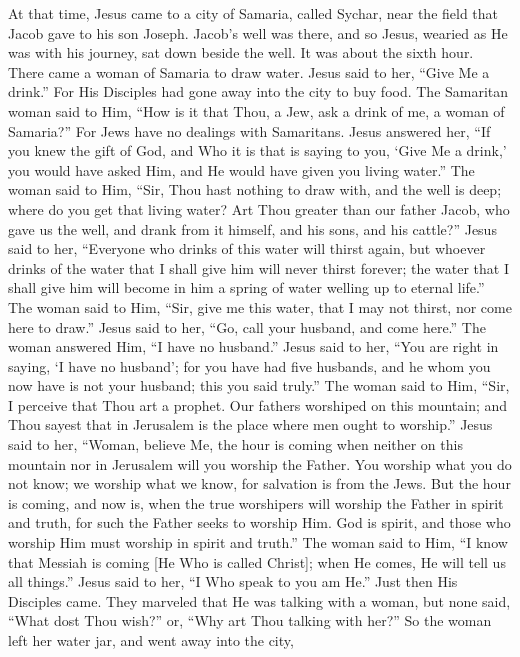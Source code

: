 \documentclass[twoside, letterpaper, 12pt]{report}
\begin{document}
\begin{maybetwocolumns}
  At that time, Jesus came to a city of Samaria, called Sychar, near the field that Jacob gave
  to his son Joseph. Jacob’s well was there, and so Jesus, wearied as He was with his journey, sat
  down beside the well. It was about the sixth hour. There came a woman of Samaria to draw water.
  Jesus said to her, “Give Me a drink.” For His Disciples had gone away into the city to buy food.
  The Samaritan woman said to Him, “How is it that Thou, a Jew, ask a drink of me, a woman of
  Samaria?” For Jews have no dealings with Samaritans. Jesus answered her, “If you knew the gift
  of God, and Who it is that is saying to you, ‘Give Me a drink,’ you would have asked Him, and
  He would have given you living water.” The woman said to Him, “Sir, Thou hast nothing to draw
  with, and the well is deep; where do you get that living water? Art Thou greater than our father
  Jacob, who gave us the well, and drank from it himself, and his sons, and his cattle?” Jesus said
  to her, “Everyone who drinks of this water will thirst again, but whoever drinks of the water that I
  shall give him will never thirst forever; the water that I shall give him will become in him a spring
  of water welling up to eternal life.” The woman said to Him, “Sir, give me this water, that I may
  not thirst, nor come here to draw.” Jesus said to her, “Go, call your husband, and come here.” The
  woman answered Him, “I have no husband.” Jesus said to her, “You are right in saying, ‘I have
  no husband’; for you have had five husbands, and he whom you now have is not your husband;
  this you said truly.” The woman said to Him, “Sir, I perceive that Thou art a prophet. Our fathers
  worshiped on this mountain; and Thou sayest that in Jerusalem is the place where men ought to
  worship.” Jesus said to her, “Woman, believe Me, the hour is coming when neither on this
  mountain nor in Jerusalem will you worship the Father. You worship what you do not know; we
  worship what we know, for salvation is from the Jews. But the hour is coming, and now is, when
  the true worshipers will worship the Father in spirit and truth, for such the Father seeks to worship
  Him. God is spirit, and those who worship Him must worship in spirit and truth.” The woman
  said to Him, “I know that Messiah is coming [He Who is called Christ]; when He comes, He will
  tell us all things.” Jesus said to her, “I Who speak to you am He.” Just then His Disciples came.
  They marveled that He was talking with a woman, but none said, “What dost Thou wish?” or,
  “Why art Thou talking with her?” So the woman left her water jar, and went away into the city,

\end{maybetwocolumns}
\end{document}

